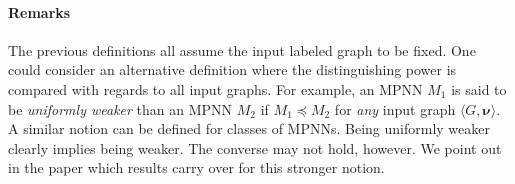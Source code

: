 \paragraph{Remarks} The previous definitions all assume the input labeled graph to be fixed. One could consider an alternative definition where the distinguishing power is compared with regards to all
input graphs. For example, an MPNN $M_1$ is said to be \textit{uniformly weaker} than an MPNN $M_2$ if $M_1\preceq M_2$ for \textit{any} input graph $\langle G,\pmb{\nu}\rangle$. A similar notion can be defined for classes of MPNNs. Being uniformly weaker clearly implies being weaker. The converse may not hold, however. We point out in the paper which results carry over for this stronger notion.

